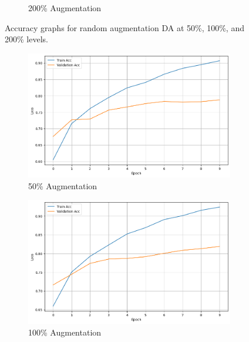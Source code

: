 \documentclass{article}
\begin{document}
\begin{figure}[ht]
\begin{subfigure}[b]{0.3\textwidth}
    \caption{200\% Augmentation}
    \label{fig:random_100}
  \end{subfigure}
  \caption{Accuracy graphs for random augmentation DA at 50\%, 100\%, and 200\% levels.}
  \label{fig:random_extreme_substitution_acc}
\end{figure}

\begin{figure}[ht]
  \centering
  \begin{subfigure}[b]{0.3\textwidth}
    \includegraphics[width=\textwidth]{img/synonym_50.png}
    \caption{50\% Augmentation}
    \label{fig:synonym_50}
  \end{subfigure}
  \hfill
  \begin{subfigure}[b]{0.3\textwidth}
    \includegraphics[width=\textwidth]{img/synonym_100.png}
    \caption{100\% Augmentation}
    \label{fig:synonym_100}
  \end{subfigure}
  \hfill
  \begin{subfigure}[b]{0.3\textwidth}

\end{subfigure}
\end{figure}
\end{document}
